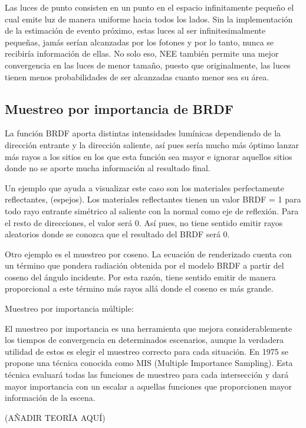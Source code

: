 Las luces de punto consisten en un punto en el espacio infinitamente pequeño el cual emite luz de manera uniforme hacia todos los lados. Sin la implementación de la estimación de evento próximo, estas luces al ser infinitesimalmente pequeñas, jamás serían alcanzadas por los fotones y por lo tanto, nunca se recibiría información de ellas. No solo eso, NEE también permite una mejor convergencia en las luces de menor tamaño, puesto que originalmente, las luces tienen menos probabilidades de ser alcanzadas cuanto menor sea su área.


\subsection{Muestreo por importancia de BRDF}

La función BRDF aporta distintas intensidades lumínicas dependiendo de la dirección entrante y la dirección saliente, así pues sería mucho más óptimo lanzar más rayos a los sitios en los que esta función sea mayor e ignorar aquellos sitios donde no se aporte mucha información al resultado final.

Un ejemplo que ayuda a visualizar este caso son los materiales perfectamente reflectantes, (espejos). Los materiales reflectantes tienen un valor BRDF = 1 para todo rayo entrante simétrico al saliente con la normal como eje de reflexión. Para el resto de direcciones, el valor será 0. Así pues, no tiene sentido emitir rayos aleatorios donde se conozca que el resultado del BRDF será 0.

Otro ejemplo es el muestreo por coseno. La ecuación de renderizado cuenta con un término que pondera radiación obtenida por el modelo BRDF a partir del coseno del ángulo incidente. Por esta razón, tiene sentido emitir de manera proporcional a este término más rayos allá donde el coseno es más grande.

Muestreo por importancia múltiple:

El muestreo por importancia es una herramienta que mejora considerablemente los tiempos de convergencia en determinados escenarios, aunque la verdadera utilidad de estos es elegir el muestreo correcto para cada situación. En 1975 se propone una técnica conocida como MIS (Multiple Importance Sampling). Esta técnica evaluará todas las funciones de  muestreo para cada intersección y dará mayor importancia con un escalar a aquellas funciones que proporcionen mayor información de la escena.

(AÑADIR TEORÏA AQUÍ)







